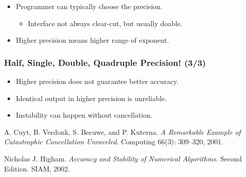 \begin{frame}
\begin{itemize}
\begin{itemize}
\end{itemize}

\item<3-> Programmer can typically choose the precision.

\begin{itemize}

\item Interface not always clear-cut, but usually doable.

\end{itemize}

\item<4-> Higher precision means higher range of exponent.

\end{itemize}

\vspace{\fill}

\end{frame}


\begin{frame}

\frametitle{Half, Single, Double, Quadruple Precision! (3/3)}

\vspace{\fill}

\begin{itemize}

\item Higher precision does not guarantee better
accuracy\cite{cuyt-et-al-2001}.

\item Identical output in higher precision is unreliable\cite{cuyt-et-al-2001}.

\item Instability can happen without cancellation\cite{higham-2002}.

\end{itemize}

\vspace{\fill}

\footnotesize

\begin{thebibliography}{9}

 A. Cuyt, B. Verdonk, S. Becuwe, and P. Kuterna.
\emph{A Remarkable Example of Catastrophic Cancellation Unraveled}. Computing
66(3): 309--320, 2001.

 Nicholas J. Higham. \emph{Accuracy and Stability of
Numerical Algorithms}. Second Edition. SIAM, 2002.

\end{thebibliography}

\end{frame}
